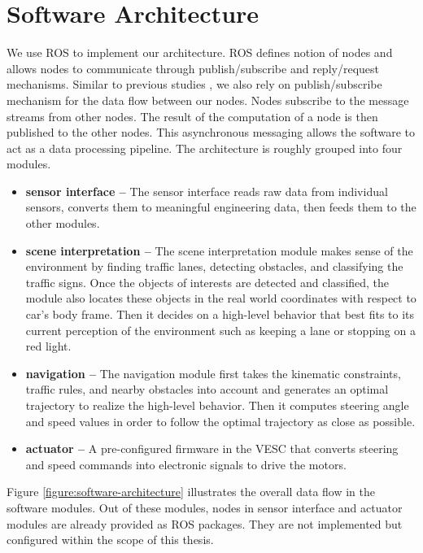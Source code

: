 \section{Software Architecture}

We use ROS \cite{Quigley2009ROSAO} to implement our architecture. ROS defines
notion of nodes and allows nodes to communicate through publish/subscribe and
reply/request mechanisms. Similar to previous studies \cite{
Thrun2006StanleyTR, Montemerlo2009JuniorTS, Kato2018AutowareOB}, we also rely
on publish/subscribe mechanism for the data flow between our nodes. Nodes
subscribe to the message streams from other nodes. The result of the
computation of a node is then published to the other nodes. This asynchronous
messaging allows the software to act as a data processing pipeline. The
architecture is roughly grouped into four modules.

\begin{itemize}
  \item \textbf{sensor interface --} The sensor interface reads raw data from
    individual sensors, converts them to meaningful engineering data, then
    feeds them to the other modules.
  \item \textbf{scene interpretation --} The scene interpretation module
    makes sense of the environment by finding traffic lanes,
    detecting obstacles, and classifying the traffic signs. Once the
    objects of interests are detected and classified, the module also
    locates these objects in the real world coordinates with respect to
    car's body frame. Then it decides on a high-level behavior that best
    fits to its current perception of the environment such as keeping a
    lane or stopping on a red light.
  \item \textbf{navigation --} The navigation module first takes the
    kinematic constraints, traffic rules, and nearby obstacles into account
    and generates an optimal trajectory to realize the high-level behavior.
    Then it computes steering angle and speed values in order to follow the
    optimal trajectory as close as possible.
  \item \textbf{actuator --} A pre-configured firmware in the VESC that
    converts steering and speed commands into electronic signals to drive the
    motors.
\end{itemize}

Figure \ref{figure:software-architecture} illustrates the overall data flow in
the software modules. Out of these modules, nodes in sensor interface and
actuator modules are already provided as ROS packages. They are not implemented
but configured within the scope of this thesis.


